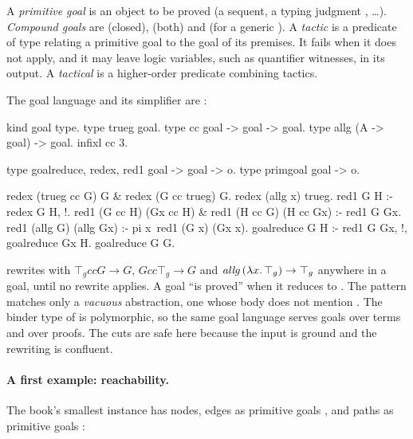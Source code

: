 {\begin{definition}\label{def:apps-tactic}
A \emph{primitive goal} is an object to be proved (a sequent, a typing judgment , \ldots).
\emph{Compound goals} are  (closed),  (both) and  (for a generic
). A \emph{tactic} is a predicate of type  relating a primitive goal to the
goal of its premises. It fails when it does not apply, and it may leave logic variables, such as
quantifier witnesses, in its output. A \emph{tactical} is a higher-order predicate combining tactics.
\end{definition}

\noindent The goal language and its simplifier are :

\begin{lprolog}
kind  goal     type.
type  trueg    goal.                    %
type  cc       goal -> goal -> goal.    %
type  allg     (A -> goal) -> goal.     %
infixl cc 3.

type  goalreduce, redex, red1   goal -> goal -> o.
type  primgoal                  goal -> o.

redex (trueg cc G) G & redex (G cc trueg) G.
redex (allg x\trueg) trueg.
red1 G H :- redex G H, !.
red1 (G cc H) (Gx cc H) &
red1 (H cc G) (H cc Gx) :- red1 G Gx.
red1 (allg G) (allg Gx) :- pi x\ red1 (G x) (Gx x).
goalreduce G H :- red1 G Gx, !, goalreduce Gx H.
goalreduce G G.
\end{lprolog}

\noindent {} rewrites with $\top_g\mathbin{cc}G\to G$, $G\mathbin{cc}\top_g\to G$ and
$\mathit{allg}\,(\lambda x.\,\top_g)\to\top_g$ anywhere in a goal, until no rewrite applies. A goal ``is
proved'' when it reduces to . The pattern  matches only a \emph{vacuous}
abstraction, one whose body does not mention . The binder type  of  is polymorphic,
so the same goal language serves goals over terms and over proofs. The cuts are safe here because the
input is ground and the rewriting is confluent.

\paragraph{A first example: reachability.} The book's smallest instance has nodes, edges as primitive goals
, and paths as primitive goals  :

}
